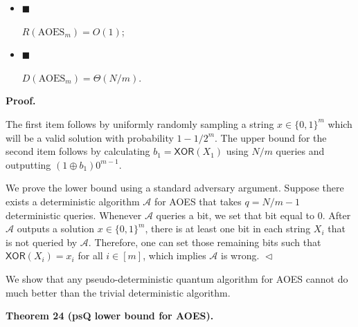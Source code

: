 \begin{itemize}


\item[] 
$\blacksquare$ 


$R({\text{AOES}}_{m})=O(1)$;\par





\item[] 
$\blacksquare$ 


$D({\text{AOES}}_{m})=\Theta(N/m)$.\par





\end{itemize}






\par\medskip\noindent\textbf{
\textbf{Proof}.}\par




The first item follows by uniformly randomly sampling a string $x\in\{0,1\}^{m}$ which will be a valid solution with probability $1-1/2^{m}$. The upper bound for the second item follows by calculating $b_{1}=\mathsf{XOR}(X_{1})$ using $N/m$ queries and outputting $(1\oplus b_{1})0^{m-1}$.\par




We prove the lower bound using a standard adversary argument. Suppose there exists a deterministic algorithm $\mathcal{A}$ for AOES that takes $q=N/m-1$ deterministic queries. Whenever $\mathcal{A}$ queries a bit, we set that bit equal to $0$. After $\mathcal{A}$ outputs a solution $x\in\{0,1\}^{m}$, there is at least one bit in each string $X_{i}$ that is not queried by $\mathcal{A}$. Therefore, one can set those remaining bits such that $\mathsf{XOR}(X_{i})=x_{i}$ for all $i\in[m]$, which implies $\mathcal{A}$ is wrong.
$\vartriangleleft$\par




We show that any pseudo-deterministic quantum algorithm for AOES cannot do much better than the trivial deterministic algorithm.\par





\par\medskip\noindent\textbf{
\textbf{Theorem 24}\textbf{ }(psQ lower bound for AOES)\textbf{.}
}\par



